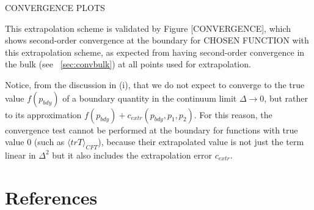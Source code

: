 \documentclass[12pt]{iopart} %
\begin{document}
CONVERGENCE PLOTS

This extrapolation scheme is validated by Figure [CONVERGENCE], which shows second-order convergence at the boundary for CHOSEN FUNCTION with this extrapolation scheme, as expected from having second-order convergence in the bulk (see ~\ref{sec:convbulk}) at all points used for extrapolation.


Notice, from the discussion in (i), that we do not expect to converge to the true value $f(p_{bdy})$ of a boundary quantity in the continuum limit $\Delta\rightarrow0$, but rather to its approximation $f(p_{bdy})+c_{extr}(p_{bdy},p_1,p_2)$.
For this reason, the convergence test  cannot be performed at the boundary for functions with true value 0 (such as $\langle trT \rangle_{CFT}$), because their extrapolated value is not just the term linear in $\Delta^2$ but it also includes the extrapolation error $c_{extr}$.




\section*{References}


\end{document}
